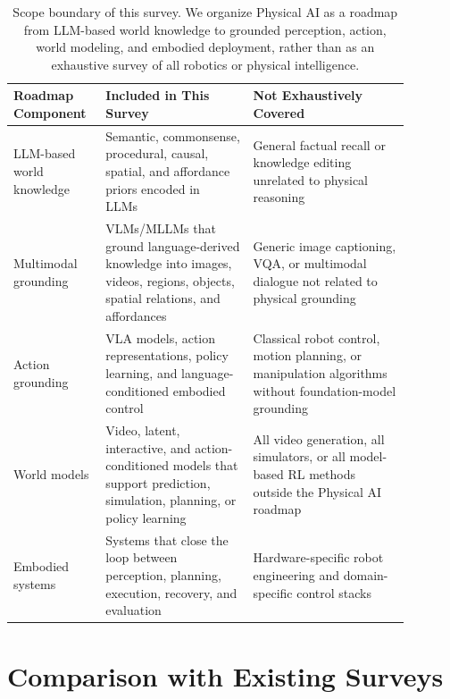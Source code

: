 \begin{table}[t]
\centering
\small
\begin{tabular}{p{0.18\linewidth}p{0.34\linewidth}p{0.36\linewidth}}
\toprule
Roadmap Component & Included in This Survey & Not Exhaustively Covered \\
\midrule
LLM-based world knowledge 
& Semantic, commonsense, procedural, causal, spatial, and affordance priors encoded in LLMs~\citep{petroni2019language,roberts2020knowledge,kandpal2023longtail,chang2024factualpretraining}
& General factual recall or knowledge editing unrelated to physical reasoning \\
\midrule
Multimodal grounding 
& VLMs/MLLMs that ground language-derived knowledge into images, videos, regions, objects, spatial relations, and affordances~\citep{alayrac2022flamingo,li2023blip,liu2023llava,team2023gemini}
& Generic image captioning, VQA, or multimodal dialogue not related to physical grounding \\
\midrule
Action grounding 
& VLA models, action representations, policy learning, and language-conditioned embodied control~\citep{driess2023palm,zitkovich2023rt,kim2024openvla,black2024pi0}
& Classical robot control, motion planning, or manipulation algorithms without foundation-model grounding \\
\midrule
World models 
& Video, latent, interactive, and action-conditioned models that support prediction, simulation, planning, or policy learning~\citep{ha2018world,hafner2019planet,hafner2020dreamer,schrittwieser2020mastering,agarwal2025cosmos}
& All video generation, all simulators, or all model-based RL methods outside the Physical AI roadmap \\
\midrule
Embodied systems 
& Systems that close the loop between perception, planning, execution, recovery, and evaluation~\citep{team2025gemini1,team2025gemini15,bjorck2025gr00tn1,intelligence2026pi}
& Hardware-specific robot engineering and domain-specific control stacks \\
\bottomrule
\end{tabular}
\caption{Scope boundary of this survey. We organize Physical AI as a roadmap from LLM-based world knowledge to grounded perception, action, world modeling, and embodied deployment, rather than as an exhaustive survey of all robotics or physical intelligence.}
\label{tab:scope-boundary}
\end{table}

\section{Comparison with Existing Surveys}
\label{app:survey-comparison}

